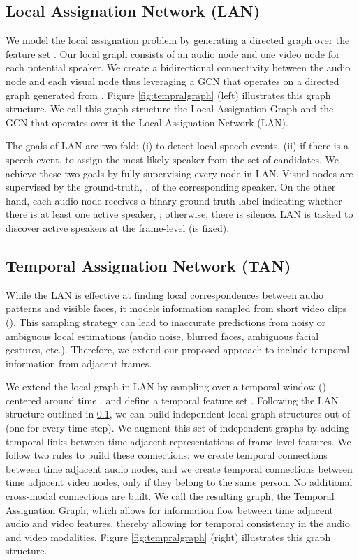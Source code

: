 \documentclass[10pt,twocolumn,letterpaper]{article}
\begin{document}
\subsection{Local Assignation Network (LAN)}
\label{subsec:LAN}

We model the local assignation problem by generating a directed graph over the feature set . Our local graph consists of an audio node and one video node for each potential speaker. We create a bidirectional connectivity between the audio node and each visual node thus leveraging a GCN that operates on a directed graph generated from . Figure \ref{fig:tempralgraph} (left) illustrates this graph structure. We call this graph structure the Local Assignation Graph and the GCN that operates over it the Local Assignation Network (LAN).

The goals of LAN are two-fold: (i) to detect local speech events, (ii) if there is a speech event, to assign the most likely speaker from the set of candidates. We achieve these two goals by fully supervising every node in LAN. Visual nodes are supervised by the ground-truth, , of the corresponding speaker. On the other hand, each audio node receives a binary ground-truth label indicating whether there is at least one active speaker, \ie ; otherwise, there is silence. LAN is tasked to discover active speakers at the frame-level (\ie  is fixed).


\subsection{Temporal Assignation Network (TAN)}
\label{subsec:TAN}

While the LAN is effective at finding local correspondences between audio patterns and visible faces, it models information sampled from short video clips (). This sampling strategy can lead to inaccurate predictions from noisy or ambiguous local estimations (\eg audio noise, blurred faces, ambiguous facial gestures, etc.). Therefore, we extend our proposed approach to include temporal information from adjacent frames.

We extend the local graph in LAN by sampling  over a temporal window () centered around time .   and define a temporal feature set . Following the LAN structure outlined in \ref{subsec:LAN}, we can build  independent local graph structures out of  (one for every time step). We augment this set of independent graphs by adding temporal links between time adjacent representations of frame-level features. We follow two rules to build these connections: we create temporal connections between time adjacent audio nodes, and we create temporal connections between time adjacent video nodes, only if they belong to the same person. No additional cross-modal connections are built. We call the resulting graph, the Temporal Assignation Graph, which allows for information flow between time adjacent audio and video features, thereby allowing for temporal consistency in the audio and video modalities. Figure \ref{fig:tempralgraph} (right) illustrates this graph structure. 
\end{document}
